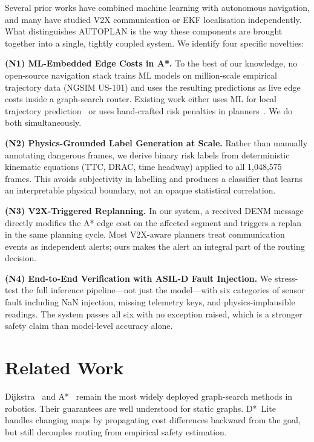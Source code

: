 \documentclass[conference]{IEEEtran}
\begin{document}
Several prior works have combined machine learning with autonomous navigation,
and many have studied V2X communication or EKF localisation independently.
What distinguishes AUTOPLAN is the way these components are brought together
into a single, tightly coupled system. We identify four specific novelties:

\textbf{(N1) ML-Embedded Edge Costs in A*.}
To the best of our knowledge, no open-source navigation stack trains ML
models on million-scale empirical trajectory data (NGSIM US-101) and uses
the resulting predictions as live edge costs inside a graph-search router.
Existing work either uses ML for local trajectory prediction~\cite{altche2017lstm}
or uses hand-crafted risk penalties in planners~\cite{gonzalez2016review}.
We do both simultaneously.

\textbf{(N2) Physics-Grounded Label Generation at Scale.}
Rather than manually annotating dangerous frames, we derive binary risk
labels from deterministic kinematic equations (TTC, DRAC, time headway)
applied to all 1,048,575 frames. This avoids subjectivity in labelling and
produces a classifier that learns an interpretable physical boundary, not an
opaque statistical correlation.

\textbf{(N3) V2X-Triggered Replanning.}
In our system, a received DENM message directly modifies the A* edge cost
on the affected segment and triggers a replan in the same planning cycle.
Most V2X-aware planners treat communication events as independent alerts;
ours makes the alert an integral part of the routing decision.

\textbf{(N4) End-to-End Verification with ASIL-D Fault Injection.}
We stress-test the full inference pipeline---not just the model---with six
categories of sensor fault including NaN injection, missing telemetry keys,
and physics-implausible readings. The system passes all six with no
exception raised, which is a stronger safety claim than model-level
accuracy alone.

\section{Related Work}
\label{sec:related}

Dijkstra~\cite{dijkstra1959note} and A*~\cite{hart1968formal} remain the
most widely deployed graph-search methods in robotics. Their guarantees are
well understood for static graphs. D*~Lite~\cite{koenig2002d} handles
changing maps by propagating cost differences backward from the goal, but
still decouples routing from empirical safety estimation.
\end{document}
